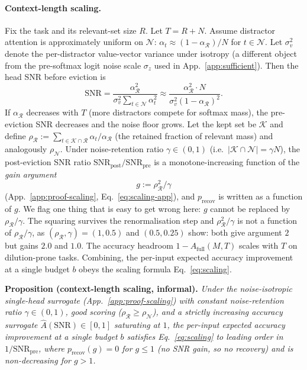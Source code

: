 \paragraph{Context-length scaling.}
Fix the task and its relevant-set size $R$. Let $T = R + N$. Assume
distractor attention is approximately uniform on $\mathcal{N}$:
$\alpha_t \approx (1 - \alpha_{\mathcal{R}}) / N$ for $t \in \mathcal{N}$.
Let $\sigma_v^2$ denote the per-distractor value-vector variance under
isotropy (a different object from the pre-softmax logit noise scale
$\sigma_z$ used in App.~\ref{app:sufficient}). Then the head SNR before
eviction is
\[
\mathrm{SNR} = \frac{\alpha_{\mathcal{R}}^2}{\sigma_v^2 \sum_{t \in \mathcal{N}}
\alpha_t^2} \approx \frac{\alpha_{\mathcal{R}}^2 \cdot N}{\sigma_v^2 (1 -
\alpha_{\mathcal{R}})^2}.
\]
If $\alpha_{\mathcal{R}}$ decreases with $T$ (more distractors compete for
softmax mass), the pre-eviction SNR decreases and the noise floor grows.
Let the kept set be $\mathcal{K}$ and define $\rho_{\mathcal{R}} :=
\sum_{t \in \mathcal{K} \cap \mathcal{R}} \alpha_t / \alpha_{\mathcal{R}}$
(the retained fraction of relevant mass) and analogously $\rho_{\mathcal{N}}$.
Under noise-retention ratio $\gamma \in (0, 1)$ (i.e.\ $|\mathcal{K} \cap
\mathcal{N}| = \gamma N$), the post-eviction SNR ratio
$\mathrm{SNR}_{\mathrm{post}} / \mathrm{SNR}_{\mathrm{pre}}$ is a
monotone-increasing function of the \emph{gain argument}
\begin{equation}
\label{eq:gain-arg}
g := \rho_{\mathcal{R}}^2 / \gamma
\end{equation}
(App.~\ref{app:proof-scaling}, Eq.~\eqref{eq:scaling-app}), and
$p_{\mathrm{recov}}$ is written as a function of $g$. We flag one thing that
is easy to get wrong here: $g$ cannot be replaced by $\rho_{\mathcal{R}} /
\gamma$. The squaring survives the renormalisation step and $\rho_{\mathcal{R}}^2
/ \gamma$ is not a function of $\rho_{\mathcal{R}} / \gamma$, as
$(\rho_{\mathcal{R}}, \gamma) = (1, 0.5)$ and $(0.5, 0.25)$ show: both give
argument $2$ but gains $2.0$ and $1.0$. The accuracy headroom
$1 - A_{\mathrm{full}}(M, T)$ scales with $T$ on dilution-prone tasks.
Combining, the per-input expected accuracy improvement at a single budget $b$
obeys the scaling formula Eq.~\eqref{eq:scaling}.

\textbf{Proposition (context-length scaling, informal).} \emph{Under the
noise-isotropic single-head surrogate (App.~\ref{app:proof-scaling}) with
constant noise-retention ratio $\gamma \in (0, 1)$, good scoring
($\rho_{\mathcal{R}} \ge \rho_{\mathcal{N}}$), and a strictly increasing
accuracy surrogate $\hat A(\mathrm{SNR}) \in [0, 1]$ saturating at $1$, the
per-input expected accuracy improvement at a single budget $b$ satisfies
Eq.~\eqref{eq:scaling} to leading order in $1/\mathrm{SNR}_{\mathrm{pre}}$,
where $p_{\mathrm{recov}}(g) = 0$ for $g \le 1$ (no SNR gain, so no recovery)
and is non-decreasing for $g > 1$.}

